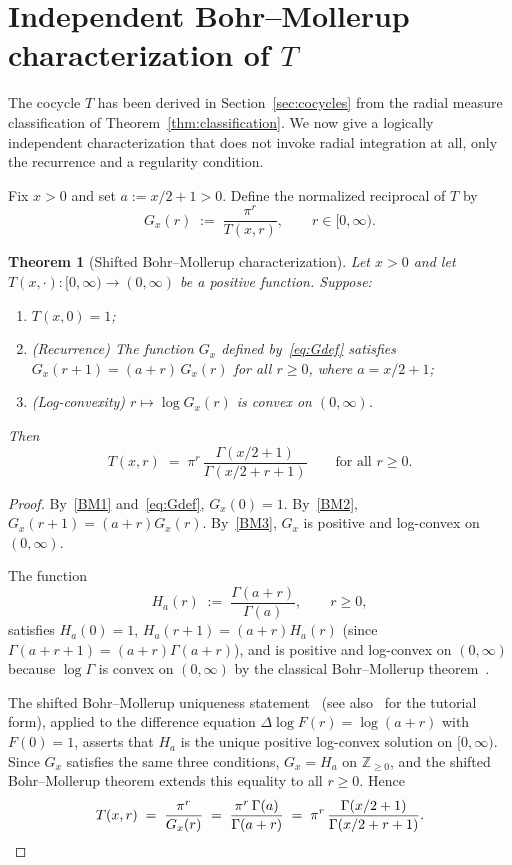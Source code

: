 \documentclass[11pt,a4paper]{article}
\theoremstyle{plain}
\newtheorem{theorem}{Theorem}[section]
\theoremstyle{definition}
\theoremstyle{remark}
\newcommand{\Z}{\mathbb{Z}}
\begin{document}
\section{Independent Bohr--Mollerup characterization of $T$}\label{sec:bohrmollerup}

The cocycle $T$ has been derived in Section~\ref{sec:cocycles} from the radial measure classification of Theorem~\ref{thm:classification}. We now give a logically independent characterization that does not invoke radial integration at all, only the recurrence and a regularity condition.

Fix $x>0$ and set $a := x/2 + 1 > 0$. Define the normalized reciprocal of $T$ by
\begin{equation}\label{eq:Gdef}
G_x(r) \;:=\; \frac{\pi^r}{T(x,r)}, \qquad r\in[0,\infty).
\end{equation}

\begin{theorem}[Shifted Bohr--Mollerup characterization]\label{thm:bohrmollerup}
Let $x>0$ and let $T(x,\cdot)\colon[0,\infty)\to(0,\infty)$ be a positive function. Suppose:
\begin{enumerate}[label={\rm(BM\arabic*)}, leftmargin=2.5em, topsep=0pt, itemsep=2pt]
\item\label{BM1} $T(x,0)=1$;
\item\label{BM2} \emph{(Recurrence)} The function $G_x$ defined by~\eqref{eq:Gdef} satisfies $G_x(r+1) = (a+r)\,G_x(r)$ for all $r\ge 0$, where $a=x/2+1$;
\item\label{BM3} \emph{(Log-convexity)} $r\mapsto \log G_x(r)$ is convex on $(0,\infty)$.
\end{enumerate}
Then
\[
T(x,r) \;=\; \pi^r\,\frac{\Gamma(x/2+1)}{\Gamma(x/2+r+1)}\qquad\text{for all } r\ge 0.
\]
\end{theorem}

\begin{proof}
By~\ref{BM1} and~\eqref{eq:Gdef}, $G_x(0)=1$. By~\ref{BM2}, $G_x(r+1)=(a+r)G_x(r)$. By~\ref{BM3}, $G_x$ is positive and log-convex on $(0,\infty)$.

The function
\[
H_a(r) \;:=\; \frac{\Gamma(a+r)}{\Gamma(a)}, \qquad r\ge 0,
\]
satisfies $H_a(0)=1$, $H_a(r+1)=(a+r)H_a(r)$ (since $\Gamma(a+r+1)=(a+r)\Gamma(a+r)$), and is positive and log-convex on $(0,\infty)$ because $\log\Gamma$ is convex on $(0,\infty)$ by the classical Bohr--Mollerup theorem~\cite[Thm.~2.1, p.~14]{Artin1964}.

The shifted Bohr--Mollerup uniqueness statement~\cite[Thm.~3.1]{MarichalZenaidi2022} (see also~\cite[\S 2]{MarichalZenaidi2024} for the tutorial form), applied to the difference equation $\Delta\!\log F(r) = \log(a+r)$ with $F(0)=1$, asserts that $H_a$ is the unique positive log-convex solution on $[0,\infty)$. Since $G_x$ satisfies the same three conditions, $G_x = H_a$ on $\Z_{\ge 0}$, and the shifted Bohr--Mollerup theorem extends this equality to all $r\ge 0$. Hence
\[
T(x,r) \;=\; \frac{\pi^r}{G_x(r)} \;=\; \frac{\pi^r\,\Gamma(a)}{\Gamma(a+r)} \;=\; \pi^r\,\frac{\Gamma(x/2+1)}{\Gamma(x/2+r+1)}. \qedhere
\]
\end{proof}
\end{document}
